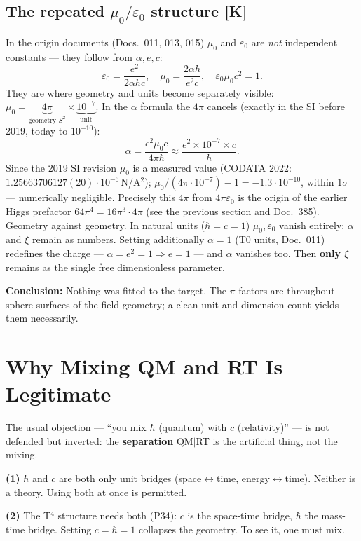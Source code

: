 \section{The repeated $\mu_0/\varepsilon_0$ structure [K]}

In the origin documents (Docs.~011, 013, 015) $\mu_0$ and
$\varepsilon_0$ are \emph{not} independent constants — they follow from
$\alpha, e, c$:
\[
  \varepsilon_0 = \frac{e^2}{2\alpha h c}, \quad
  \mu_0 = \frac{2\alpha h}{e^2 c}, \quad
  \varepsilon_0\mu_0 c^2 = 1.
\]
They are where geometry and units become separately visible:
$\mu_0 = \underbrace{4\pi}_{\text{geometry }S^2} \times
\underbrace{10^{-7}}_{\text{unit}}$. In the $\alpha$ formula the $4\pi$
cancels (exactly in the SI before 2019, today to $10^{-10}$):
\[
  \alpha = \frac{e^2\mu_0 c}{4\pi\hbar}
         \approx \frac{e^2 \times 10^{-7} \times c}{\hbar}.
\]
Since the 2019 SI revision $\mu_0$ is a measured value (CODATA 2022:
$1.25663706127(20)\cdot10^{-6}$\,N/A$^2$);
$\mu_0/(4\pi\cdot10^{-7})-1=-1.3\cdot10^{-10}$, within $1\sigma$ ---
numerically negligible. Precisely this $4\pi$ from $4\pi\varepsilon_0$ is
the origin of the earlier Higgs prefactor $64\pi^4 = 16\pi^3\cdot 4\pi$
(see the previous section and Doc.~385).
Geometry against geometry. In natural units ($\hbar = c = 1$)
$\mu_0,\varepsilon_0$ vanish entirely; $\alpha$ and $\xi$ remain as
numbers. Setting additionally $\alpha = 1$ (T0 units, Doc.~011)
redefines the charge — $\alpha = e^2 = 1 \Rightarrow e = 1$ — and
$\alpha$ vanishes too. Then \textbf{only $\xi$} remains as the single
free dimensionless parameter.

\textbf{Conclusion:} Nothing was fitted to the target. The $\pi$ factors
are throughout sphere surfaces of the field geometry; a clean unit and
dimension count yields them necessarily.

\chapter{Why Mixing QM and RT Is Legitimate}

The usual objection — ``you mix $\hbar$ (quantum) with $c$ (relativity)''
— is not defended but inverted: the \textbf{separation} QM$|$RT is the
artificial thing, not the mixing.

\textbf{(1)} $\hbar$ and $c$ are both only unit bridges
(space$\leftrightarrow$time, energy$\leftrightarrow$time). Neither is a
theory. Using both at once is permitted.

\textbf{(2)} The T$^4$ structure needs both (P34): $c$ is the space-time
bridge, $\hbar$ the mass-time bridge. Setting $c=\hbar=1$ collapses the
geometry. To see it, one must mix.

